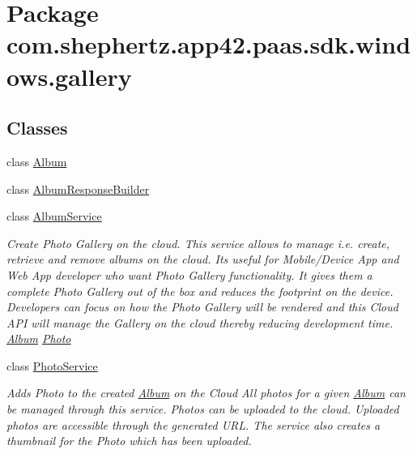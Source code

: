 \hypertarget{namespacecom_1_1shephertz_1_1app42_1_1paas_1_1sdk_1_1windows_1_1gallery}{\section{Package com.\+shephertz.\+app42.\+paas.\+sdk.\+windows.\+gallery}
\label{namespacecom_1_1shephertz_1_1app42_1_1paas_1_1sdk_1_1windows_1_1gallery}
}
\subsection*{Classes}
\begin{DoxyCompactItemize}
\item 
class \hyperlink{classcom_1_1shephertz_1_1app42_1_1paas_1_1sdk_1_1windows_1_1gallery_1_1_album}{Album}
\item 
class \hyperlink{classcom_1_1shephertz_1_1app42_1_1paas_1_1sdk_1_1windows_1_1gallery_1_1_album_response_builder}{Album\+Response\+Builder}
\item 
class \hyperlink{classcom_1_1shephertz_1_1app42_1_1paas_1_1sdk_1_1windows_1_1gallery_1_1_album_service}{Album\+Service}
\begin{DoxyCompactList}\small\item\em Create Photo Gallery on the cloud. This service allows to manage i.\+e. create, retrieve and remove albums on the cloud. Its useful for Mobile/\+Device App and Web App developer who want Photo Gallery functionality. It gives them a complete Photo Gallery out of the box and reduces the footprint on the device. Developers can focus on how the Photo Gallery will be rendered and this Cloud A\+P\+I will manage the Gallery on the cloud thereby reducing development time. \hyperlink{}{Album} \hyperlink{}{Photo} \end{DoxyCompactList}\item 
class \hyperlink{classcom_1_1shephertz_1_1app42_1_1paas_1_1sdk_1_1windows_1_1gallery_1_1_photo_service}{Photo\+Service}
\begin{DoxyCompactList}\small\item\em Adds Photo to the created \hyperlink{classcom_1_1shephertz_1_1app42_1_1paas_1_1sdk_1_1windows_1_1gallery_1_1_album}{Album} on the Cloud All photos for a given \hyperlink{classcom_1_1shephertz_1_1app42_1_1paas_1_1sdk_1_1windows_1_1gallery_1_1_album}{Album} can be managed through this service. Photos can be uploaded to the cloud. Uploaded photos are accessible through the generated U\+R\+L. The service also creates a thumbnail for the Photo which has been uploaded. \end{DoxyCompactList}\end{DoxyCompactItemize}
